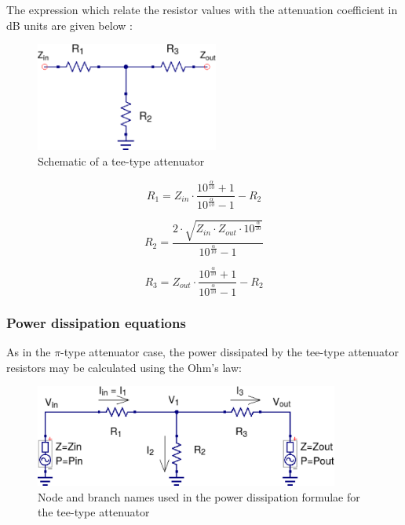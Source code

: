 \noindent The expression which relate the resistor values with the attenuation coefficient in dB units are given below \cite{Vizmuller}:

\begin{figure}[ht]
\begin{center}
\includegraphics[width=6cm]{bitmaps/synthesis/attenuators/Tee-Attenuator-Schematic.eps}
\end{center}
\caption{Schematic of a tee-type attenuator}
\label{fig:tee_attenuator_schematic}
\end{figure}

\begin{equation}
R_{1} = Z_{in} \cdot  \frac{10^{\frac{\alpha}{10}}+1}{10^{\frac{\alpha}{10}}-1} - R_{2}
\end{equation}

\begin{equation}
R_{2} = \dfrac{2 \cdot \sqrt{Z_{in} \cdot Z_{out} \cdot 10^{\frac{\alpha}{10}}}}{10^{\frac{\alpha}{10}} - 1}
\end{equation}

\begin{equation}
R_{3} = Z_{out} \cdot  \frac{10^{\frac{\alpha}{10}}+1}{10^{\frac{\alpha}{10}}-1} - R_{2}
\end{equation}

\subsubsection{Power dissipation equations}

\noindent As in the $\pi$-type attenuator case, the power dissipated by the tee-type attenuator resistors may be calculated using the Ohm's law:

\begin{figure}[ht]
\begin{center}
\includegraphics[width=10cm]{bitmaps/synthesis/attenuators/Tee-Type-Power-Dissipation}
\end{center}
\caption{Node and branch names used in the power dissipation formulae for the tee-type attenuator}
\label{fig:tee_attenuator_power_dissipation}
\end{figure}
\FloatBarrier

